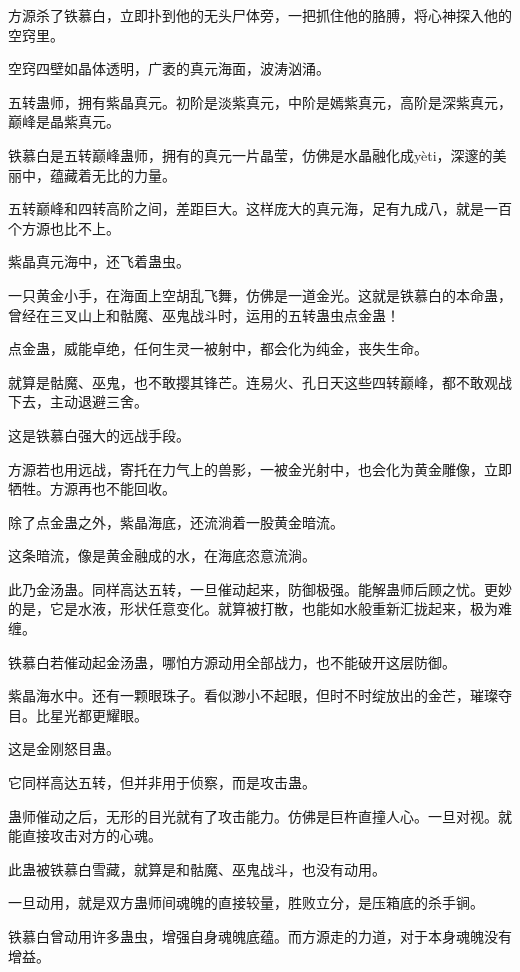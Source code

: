 
\begin{this_body}

方源杀了铁慕白，立即扑到他的无头尸体旁，一把抓住他的胳膊，将心神探入他的空窍里。

空窍四壁如晶体透明，广袤的真元海面，波涛汹涌。

五转蛊师，拥有紫晶真元。初阶是淡紫真元，中阶是嫣紫真元，高阶是深紫真元，巅峰是晶紫真元。

铁慕白是五转巅峰蛊师，拥有的真元一片晶莹，仿佛是水晶融化成yèti，深邃的美丽中，蕴藏着无比的力量。

五转巅峰和四转高阶之间，差距巨大。这样庞大的真元海，足有九成八，就是一百个方源也比不上。

紫晶真元海中，还飞着蛊虫。

一只黄金小手，在海面上空胡乱飞舞，仿佛是一道金光。这就是铁慕白的本命蛊，曾经在三叉山上和骷魔、巫鬼战斗时，运用的五转蛊虫点金蛊！

点金蛊，威能卓绝，任何生灵一被射中，都会化为纯金，丧失生命。

就算是骷魔、巫鬼，也不敢撄其锋芒。连易火、孔日天这些四转巅峰，都不敢观战下去，主动退避三舍。

这是铁慕白强大的远战手段。

方源若也用远战，寄托在力气上的兽影，一被金光射中，也会化为黄金雕像，立即牺牲。方源再也不能回收。

除了点金蛊之外，紫晶海底，还流淌着一股黄金暗流。

这条暗流，像是黄金融成的水，在海底恣意流淌。

此乃金汤蛊。同样高达五转，一旦催动起来，防御极强。能解蛊师后顾之忧。更妙的是，它是水液，形状任意变化。就算被打散，也能如水般重新汇拢起来，极为难缠。

铁慕白若催动起金汤蛊，哪怕方源动用全部战力，也不能破开这层防御。

紫晶海水中。还有一颗眼珠子。看似渺小不起眼，但时不时绽放出的金芒，璀璨夺目。比星光都更耀眼。

这是金刚怒目蛊。

它同样高达五转，但并非用于侦察，而是攻击蛊。

蛊师催动之后，无形的目光就有了攻击能力。仿佛是巨杵直撞人心。一旦对视。就能直接攻击对方的心魂。

此蛊被铁慕白雪藏，就算是和骷魔、巫鬼战斗，也没有动用。

一旦动用，就是双方蛊师间魂魄的直接较量，胜败立分，是压箱底的杀手锏。

铁慕白曾动用许多蛊虫，增强自身魂魄底蕴。而方源走的力道，对于本身魂魄没有增益。


\end{this_body}
